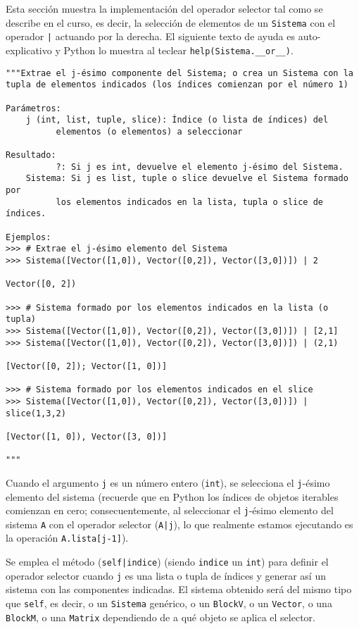 \documentclass[11pt]{report}
\begin{document}
Esta sección muestra la implementación del operador selector tal como
se describe en el curso, es decir, la selección de elementos de un
\texttt{Sistema} con el operador \texttt{|} actuando por la derecha. El siguiente
texto de ayuda es auto-explicativo y Python lo muestra al teclear
\texttt{help(Sistema.\_\_or\_\_)}.

\begin{verbatim}
"""Extrae el j-ésimo componente del Sistema; o crea un Sistema con la
tupla de elementos indicados (los índices comienzan por el número 1)

Parámetros:
    j (int, list, tuple, slice): Índice (o lista de índices) del 
          elementos (o elementos) a seleccionar

Resultado:
          ?: Si j es int, devuelve el elemento j-ésimo del Sistema.
    Sistema: Si j es list, tuple o slice devuelve el Sistema formado por
          los elementos indicados en la lista, tupla o slice de índices.

Ejemplos:
>>> # Extrae el j-ésimo elemento del Sistema 
>>> Sistema([Vector([1,0]), Vector([0,2]), Vector([3,0])]) | 2

Vector([0, 2])

>>> # Sistema formado por los elementos indicados en la lista (o tupla)
>>> Sistema([Vector([1,0]), Vector([0,2]), Vector([3,0])]) | [2,1]
>>> Sistema([Vector([1,0]), Vector([0,2]), Vector([3,0])]) | (2,1)

[Vector([0, 2]); Vector([1, 0])]

>>> # Sistema formado por los elementos indicados en el slice
>>> Sistema([Vector([1,0]), Vector([0,2]), Vector([3,0])]) | slice(1,3,2)

[Vector([1, 0]), Vector([3, 0])]

"""
\end{verbatim}

Cuando el argumento \texttt{j} es un número entero (\texttt{int}), se selecciona el
\texttt{j}-ésimo elemento del sistema (recuerde que en Python los índices de
objetos iterables comienzan en cero; consecuentemente, al seleccionar
el \texttt{j}-ésimo elemento del sistema \texttt{A} con el operador selector
(\texttt{A|j}), lo que realmente estamos ejecutando es la operación
\texttt{A.lista[j-1]}).

Se emplea el método (\texttt{self|indice}) (siendo \texttt{indice} un \texttt{int}) para
definir el operador selector cuando \texttt{j} es una lista o tupla de
índices y generar así un sistema con las componentes indicadas. El
sistema obtenido será del mismo tipo que \texttt{self}, es decir, o un
\texttt{Sistema} genérico, o un \texttt{BlockV}, o un \texttt{Vector}, o una \texttt{BlockM}, o
una \texttt{Matrix} dependiendo de a qué objeto se aplica el selector.
\end{document}
